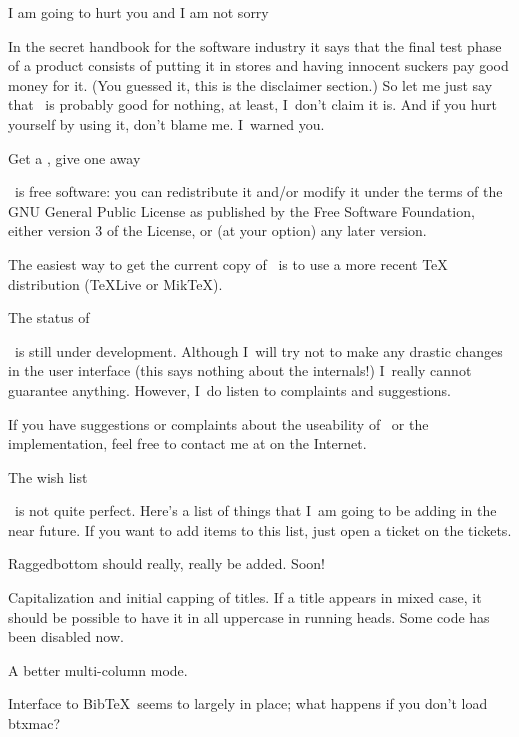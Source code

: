 \SubSection I am going to hurt you and I am not sorry

In the secret handbook for the software industry it says that the
final test phase of a product consists of putting it in stores and
having innocent suckers pay good money for it. (You guessed it, this
is the disclaimer section.) So let me just say that 
\Lollipop\ is probably good for nothing, at least, I~don't claim it
is. And if you hurt yourself by using it, don't blame me. I~warned
you.

\SubSection Get a \Lollipop, give one away

\Lollipop\ is free software: you can redistribute it and/or modify
it under the terms of the GNU General Public License as published by
the Free Software Foundation, either version 3 of the License, or
(at your option) any later version.

The easiest way to get the current copy of \Lollipop\ is to use
a more recent \TeX{} distribution (\TeX Live or Mik\TeX).

\SubSection The status of \Lollipop

\Lollipop\ is still under development. Although I~will try not to
make any drastic changes in the user interface (this says nothing
about the internals!) I~really cannot guarantee anything.
However, I~do listen to complaints and suggestions. 

If you have suggestions or complaints about the
useability of \Lollipop\ or the implementation, feel free to contact
me at  on the Internet. 

 The wish list

\Lollipop\ is not quite perfect. Here's a list of things that I~am
going to be adding in the near future. If you want to add items to
this list, just open a ticket on the tickets.

\Enumerate\item Raggedbottom should really, really be added. Soon!

\item Capitalization and initial capping of titles. If a
title appears in mixed case, it should be possible to have it in all
uppercase in running heads. Some code has been disabled now.

\item A better multi-column mode.

\item Interface to Bib\TeX\ seems to largely in place; what happens
if you don't load btxmac?

